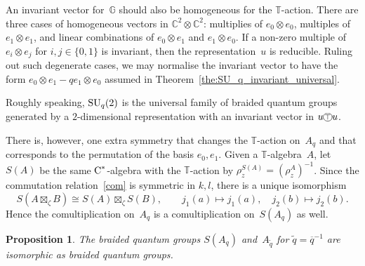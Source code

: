 \documentclass[a4paper]{amsart}
\numberwithin{equation}{section}
\newtheorem{Prop}[Thm]{Proposition}
\theoremstyle{definition}
\theoremstyle{remark}
\begin{document}
An invariant vector for~\({\mathbb{G}}\) should also be homogeneous for the
\(\mathbb{T}\){\nobreakdash}-action.  There are three cases of homogeneous
vectors in \({{\mathbb C}}^2\otimes{{\mathbb C}}^2\): multiplies of \(e_0\otimes
e_0\), multiples of \(e_1\otimes e_1\), and linear combinations of
\(e_0\otimes e_1\) and \(e_1\otimes e_0\).  If a non-zero multiple
of~\(e_i\otimes e_j\) for \(i,j\in\{0,1\}\) is invariant, then the
representation~$u$ is reducible.  Ruling out such degenerate cases, we
may normalise the invariant vector to have the form \(e_0\otimes e_1
-qe_1\otimes e_0\) assumed in
Theorem~\ref{the:SU_q_invariant_universal}.

Roughly speaking, ${\textup{SU}}_q(2)$ is the universal family of braided
quantum groups generated by a $2${\nobreakdash}-dimensional representation with
an invariant vector in \(u{\mathbin{\xymatrix{*+<.7ex>[o][F-]{\scriptstyle\top}}}} u\).

There is, however, one extra symmetry that changes the
\(\mathbb{T}\){\nobreakdash}-action on~\(A_q\) and that corresponds to the
permutation of the basis \(e_0,e_1\).  Given a
\(\mathbb{T}\){\nobreakdash}-algebra~\(A\), let \(S(A)\) be the same
\({\textup{C}^*}\){\nobreakdash}-algebra with the \(\mathbb{T}\){\nobreakdash}-action by
\(\rho^{S(A)}_z = (\rho^A_z)^{-1}\).  Since the commutation
relation~\eqref{com} is symmetric in \(k,l\), there is a unique
isomorphism
\[
S(A\boxtimes_\zeta B) \cong S(A) \boxtimes_\zeta S(B),\qquad
j_1(a)\mapsto j_1(a),\quad j_2(b)\mapsto j_2(b).
\]
Hence the comultiplication on~\(A_q\) is a comultiplication
on~\(S(A_q)\) as well.

\begin{Prop}
  \label{pro:Aq_symmetry}
  The braided quantum groups \(S(A_q)\) and~\(A_{\tilde{q}}\) for
  \(\tilde{q} = {\overline{q}}^{-1}\) are isomorphic as braided quantum
  groups.
\end{Prop}
\end{document}
